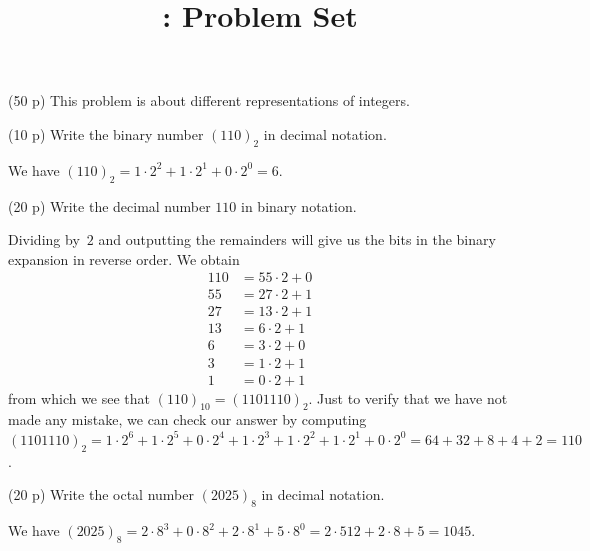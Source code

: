 \documentclass{jn-pset}
\author{\courseinstructor}
\title{\coursenameshort: Problem Set \psetno}
\begin{document}
\maketitle




\begin{problem}
  (50 p)
%
  This problem is about different representations of integers.

\begin{subproblem}%
  {(10 p)}
  {\ignorespaces}
  Write the binary number $(110)_2$ in decimal notation.
\end{subproblem}

\begin{solution}
  We have
  $(110)_2
  =
  1 \cdot 2^2 + 
  1 \cdot 2^1 + 
  0 \cdot 2^0
  =
  6
  $.
\end{solution}

\begin{subproblem}%
  {(20 p)}
  {\ignorespaces}
  Write the decimal number $110$ in binary notation.
\end{subproblem}

\begin{solution}
  Dividing by~$2$ and outputting the remainders will give us the
  bits in the binary expansion in reverse order. We obtain 
  \begin{align*}
    110 &= 55 \cdot 2 + 0 \\
    55  &= 27 \cdot 2 + 1 \\
    27  &= 13 \cdot 2 + 1 \\
    13  &=  6 \cdot 2 + 1 \\
    6   &=  3 \cdot 2 + 0 \\
    3   &=  1 \cdot 2 + 1 \\
    1   &=  0 \cdot 2 + 1 
  \end{align*}
  from which we see that
  $
  (110)_{10}
  = 
  (1101110)_2
  $.
  Just to verify that we have not made any mistake, we can check our answer by 
  computing
  $
  (1101110)_2
  =
  1 \cdot 2^6 + 
  1 \cdot 2^5 + 
  0 \cdot 2^4 + 
  1 \cdot 2^3 + 
  1 \cdot 2^2 + 
  1 \cdot 2^1 + 
  0 \cdot 2^0 
  =
  64 + 
  32 + 
  8 + 
  4 + 
  2
  =
  110
  $.
\end{solution}

  
\begin{subproblem}%
  {(20 p)}
  {\ignorespaces}
  Write the octal number $(2025)_8$ in decimal notation.
\end{subproblem}

\begin{solution}
  We have
 $(2025)_8
 =
 2 \cdot 8^3 + 
 0 \cdot 8^2 + 
 2 \cdot 8^1 + 
 5 \cdot 8^0
 =
 2 \cdot 512 + 
 2 \cdot 8 +
 5
 = 
 1045
 $.
\end{solution}

\end{problem}
\end{document}
